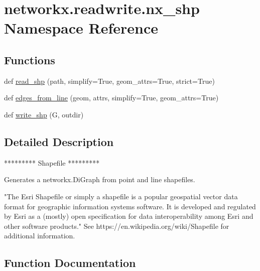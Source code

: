 \hypertarget{namespacenetworkx_1_1readwrite_1_1nx__shp}{}\section{networkx.\+readwrite.\+nx\+\_\+shp Namespace Reference}
\label{namespacenetworkx_1_1readwrite_1_1nx__shp}
\subsection*{Functions}
\begin{DoxyCompactItemize}
\item 
def \hyperlink{namespacenetworkx_1_1readwrite_1_1nx__shp_aeb1154cdcdd9fb9f0b7e847a480f4bb6}{read\+\_\+shp} (path, simplify=True, geom\+\_\+attrs=True, strict=True)
\item 
def \hyperlink{namespacenetworkx_1_1readwrite_1_1nx__shp_a7da171ddec0f17df2e90ac5b7e842af0}{edges\+\_\+from\+\_\+line} (geom, attrs, simplify=True, geom\+\_\+attrs=True)
\item 
def \hyperlink{namespacenetworkx_1_1readwrite_1_1nx__shp_a435be46a19405134a855f8dd70df49b3}{write\+\_\+shp} (G, outdir)
\end{DoxyCompactItemize}


\subsection{Detailed Description}
\begin{DoxyVerb}*********
Shapefile
*********

Generates a networkx.DiGraph from point and line shapefiles.

"The Esri Shapefile or simply a shapefile is a popular geospatial vector
data format for geographic information systems software. It is developed
and regulated by Esri as a (mostly) open specification for data
interoperability among Esri and other software products."
See https://en.wikipedia.org/wiki/Shapefile for additional information.
\end{DoxyVerb}
 

\subsection{Function Documentation}
\mbox{\label{namespacenetworkx_1_1readwrite_1_1nx__shp_a7da171ddec0f17df2e90ac5b7e842af0}} 
